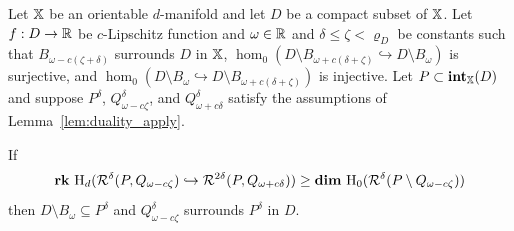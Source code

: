 \begin{theorem}\label{thm:algo_tcc}
  Let $\mathbb{X}$ be an orientable $d$-manifold and let $D$ be a compact subset of $\mathbb{X}$.
  Let $f : D\to\mathbb{R}$ be $c$-Lipschitz function and $\omega\in\mathbb{R}$ and $\delta\leq\zeta < \varrho_D$ be constants such that
  $B_{\omega - c(\zeta +\delta)}$ surrounds $D$ in $\mathbb{X}$,
  $\hom_0(D\setminus B_{\omega+c(\delta+\zeta)}\hookrightarrow D\setminus B_\omega)$ is surjective, and
  $\hom_0(D\setminus B_\omega\hookrightarrow D\setminus B_{\omega+c(\delta+\zeta)})$ is injective.
  Let $P\subset \mathbf{int}_{\mathbb{X}}(D)$ and suppose $P^\delta$, $Q_{\omega-c\zeta}^\delta$, and $Q_{\omega+c\delta}^\delta$ satisfy the assumptions of Lemma~\ref{lem:duality_apply}.

  If
  \[\mathbf{rk}~\mathrm{H}_d(\mathcal{R}^\delta(P, Q_{\omega -c\zeta})\hookrightarrow \mathcal{R}^{2\delta}(P, Q_{\omega+c\delta})) \geq \mathbf{dim}~\mathrm{H}_0(\mathcal{R}^\delta(P\setminus Q_{\omega-c\zeta}))\]
  then $D\setminus B_\omega\subseteq P^\delta$ and $Q_{\omega-c\zeta}^\delta$ surrounds $P^\delta$ in $D$.
\end{theorem}
